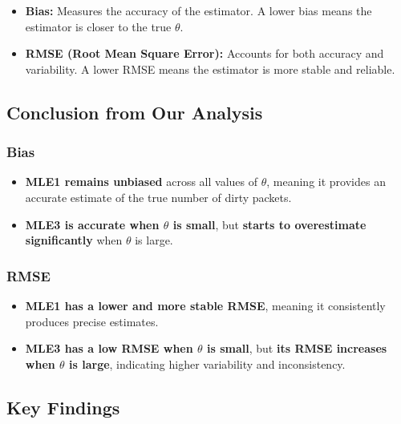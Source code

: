 \documentclass[
  14pt,
]{article}
\providecommand{\tightlist}{%
  \setlength{\itemsep}{0pt}\setlength{\parskip}{0pt}}
\begin{document}
\begin{itemize}
\tightlist
\item
  \textbf{Bias:} Measures the accuracy of the estimator. A lower bias
  means the estimator is closer to the true \(\theta\).\\
\item
  \textbf{RMSE (Root Mean Square Error):} Accounts for both accuracy and
  variability. A lower RMSE means the estimator is more stable and
  reliable.
\end{itemize}

\subsection{\texorpdfstring{\textbf{Conclusion from Our
Analysis}}{Conclusion from Our Analysis}}\label{conclusion-from-our-analysis}

\subsubsection{\texorpdfstring{\textbf{Bias}}{Bias}}\label{bias}

\begin{itemize}
\tightlist
\item
  \textbf{MLE1 remains unbiased} across all values of \(\theta\),
  meaning it provides an accurate estimate of the true number of dirty
  packets.\\
\item
  \textbf{MLE3 is accurate when \(\theta\) is small}, but \textbf{starts
  to overestimate significantly} when \(\theta\) is large.
\end{itemize}

\subsubsection{\texorpdfstring{\textbf{RMSE}}{RMSE}}\label{rmse}

\begin{itemize}
\tightlist
\item
  \textbf{MLE1 has a lower and more stable RMSE}, meaning it
  consistently produces precise estimates.\\
\item
  \textbf{MLE3 has a low RMSE when \(\theta\) is small}, but \textbf{its
  RMSE increases when \(\theta\) is large}, indicating higher
  variability and inconsistency.
\end{itemize}

\subsection{\texorpdfstring{\textbf{Key
Findings}}{Key Findings}}\label{key-findings}
\end{document}
